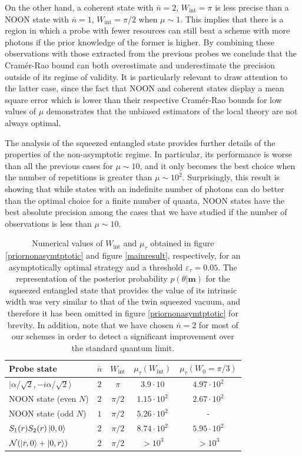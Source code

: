 On the other hand, a coherent state with $\bar{n} = 2$, $W_{\mathrm{int}} = \pi$ is less precise than a NOON state with $\bar{n} = 1$, $W_{\mathrm{int}} = \pi/2$ when $\mu \sim 1$. This implies that there is a region in which a probe with fewer resources can still beat a scheme with more photons if the prior knowledge of the former is higher. By combining these observations with those extracted from the previous probes we conclude that the Cram\'{e}r-Rao bound can both overestimate and underestimate the precision outside of its regime of validity. It is particularly relevant to draw attention to the latter case, since the fact that NOON and coherent states display a mean square error which is lower than their respective Cram\'{e}r-Rao bounds for low values of $\mu$ demonstrates that the unbiased estimators of the local theory are not always optimal.

The analysis of the squeezed entangled state provides further details of the properties of the non-asymptotic regime. In particular, its performance is worse than all the previous cases for $\mu \sim 10$, and it only becomes the best choice when the number of repetitions is greater than $\mu \sim 10^2$. Surprisingly, this result is showing that while states with an indefinite number of photons can do better than the optimal choice for a finite number of quanta, NOON states have the best absolute precision among the cases that we have studied if the number of observations is less than $\mu \sim 10$.

\begin{table} [t]
\centering
{\renewcommand{\arraystretch}{1.05}
\begin{tabular}{|l|c|c|c|c|}
\hline
Probe state & $\bar{n}$ & $W_{\mathrm{int}}$ & $\mu_{\tau} (W_{\mathrm{int}})$ & $\mu_{\tau} (W_0=\pi/3)$\\
\hline
\hline
$|\alpha/\sqrt{2},-i\alpha/\sqrt{2}\rangle$ & $2$ & $\pi$ & $3.9\cdot 10$ & $4.97\cdot 10^2$\\
NOON state (even $N$) & $2$ & $\pi/2$ & $1.15\cdot 10^2$ &$2.67\cdot 10^2$\\
NOON state (odd $N$)& $1$ & $\pi/2$ & $5.26\cdot 10^2$ & - \\
$S_1(r)S_2(r)\ket{0,0}$ & $2$ & $\pi/2$ & $8.74\cdot 10^2$ & $5.95\cdot 10^2$\\
$\mathcal{N}(\ket{r,0}+\ket{0,r})$ & $2$ & $\pi/2$ & $>10^3$ &$ >10^3$\\
\hline
\end{tabular}}
\caption[Conditions to reach the asymptotic regime]{Numerical values of $W_{\mathrm{int}}$ and $\mu_{\tau}$ obtained in figure \ref{priornonasymtptotic} and figure \ref{mainresult}, respectively, for an asymptotically optimal strategy and a threshold $\varepsilon_\tau = 0.05$. The representation of the posterior probability $p(\theta|\boldsymbol{m})$ for the squeezed entangled state that provides the value of its intrinsic width was very similar to that of the twin squeezed vacuum, and therefore it has been omitted in figure \ref{priornonasymtptotic} for brevity. In addition, note that we have chosen $\bar{n} = 2$ for most of our schemes in order to detect a significant improvement over the standard quantum limit.}
\label{table_summary}
\end{table}


